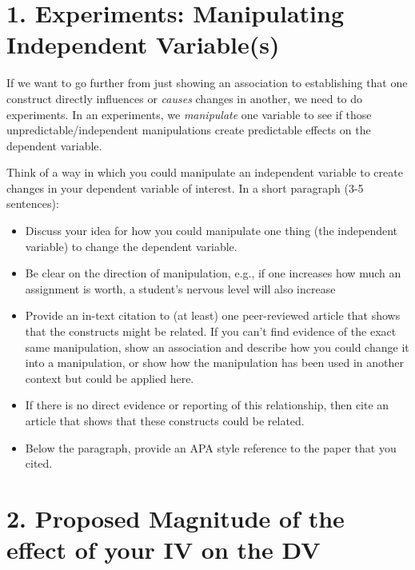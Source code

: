 \documentclass[
]{book}
\begin{document}
\section*{1. Experiments: Manipulating Independent Variable(s)}\label{experiments-manipulating-independent-variables}

If we want to go further from just showing an association to establishing that one construct directly influences or \emph{causes} changes in another, we need to do experiments. In an experiments, we \emph{manipulate} one variable to see if those unpredictable/independent manipulations create predictable effects on the dependent variable.

Think of a way in which you could manipulate an independent variable to create changes in your dependent variable of interest. In a short paragraph (3-5 sentences):

\begin{itemize}
\item
  Discuss your idea for how you could manipulate one thing (the independent variable) to change the dependent variable.
\item
  Be clear on the direction of manipulation, e.g., if one increases how much an assignment is worth, a student's nervous level will also increase
\item
  Provide an in-text citation to (at least) one peer-reviewed article that shows that the constructs might be related. If you can't find evidence of the exact same manipulation, show an association and describe how you could change it into a manipulation, or show how the manipulation has been used in another context but could be applied here.
\item
  If there is no direct evidence or reporting of this relationship, then cite an article that shows that these constructs could be related.
\item
  Below the paragraph, provide an APA style reference to the paper that you cited.
\end{itemize}

\section*{2. Proposed Magnitude of the effect of your IV on the DV}\label{proposed-magnitude-of-the-effect-of-your-iv-on-the-dv}
\end{document}
